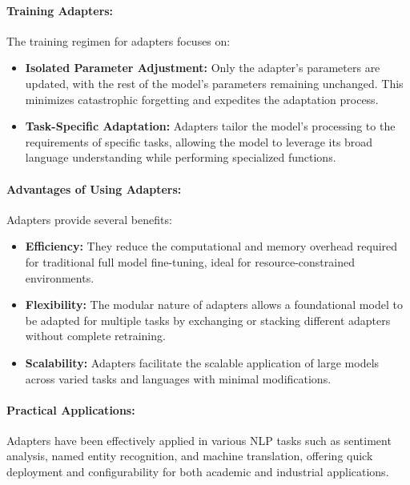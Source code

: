 \documentclass[12pt]{article}
\begin{document}
\paragraph{Training Adapters:}
The training regimen for adapters focuses on:
\begin{itemize}
    \item \textbf{Isolated Parameter Adjustment:} Only the adapter’s parameters are updated, with the rest of the model's parameters remaining unchanged. This minimizes catastrophic forgetting and expedites the adaptation process.
    \item \textbf{Task-Specific Adaptation:} Adapters tailor the model’s processing to the requirements of specific tasks, allowing the model to leverage its broad language understanding while performing specialized functions.
\end{itemize}

\paragraph{Advantages of Using Adapters:}
Adapters provide several benefits:
\begin{itemize}
    \item \textbf{Efficiency:} They reduce the computational and memory overhead required for traditional full model fine-tuning, ideal for resource-constrained environments.
    \item \textbf{Flexibility:} The modular nature of adapters allows a foundational model to be adapted for multiple tasks by exchanging or stacking different adapters without complete retraining.
    \item \textbf{Scalability:} Adapters facilitate the scalable application of large models across varied tasks and languages with minimal modifications.
\end{itemize}

\paragraph{Practical Applications:}
Adapters have been effectively applied in various NLP tasks such as sentiment analysis, named entity recognition, and machine translation, offering quick deployment and configurability for both academic and industrial applications.
\end{document}
